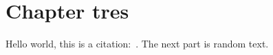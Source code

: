 \chapter{Chapter tres}
\label{chap:c3}

Hello world, this is a citation:~\cite{Guyton:1956:TextbookPhysiology}.
The next part is random text.

\lipsum


\printbibliography[heading=subbibliography]

